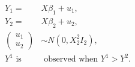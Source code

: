 \message{ !name(empirical_porject.tex)}\documentclass[12pt]{article}
\theoremstyle{plain} \newtheorem{theorem}{Theorem}
\theoremstyle{definition} \newtheorem{definition}{Definition}
\begin{document}
\begin{align*}
  Y_1 = & X\beta_1 +u_1, \\
  Y_2 = & X\beta_2 +u_2, \\
  \left( \begin{array}{c} u_1 \\ u_2 \end{array} \right)& \sim  N(0,X_2^2I_2), \\
  Y^1 \mbox{ is}& \mbox{ observed when } Y^1> Y^2.
\end{align*}
\end{document}
